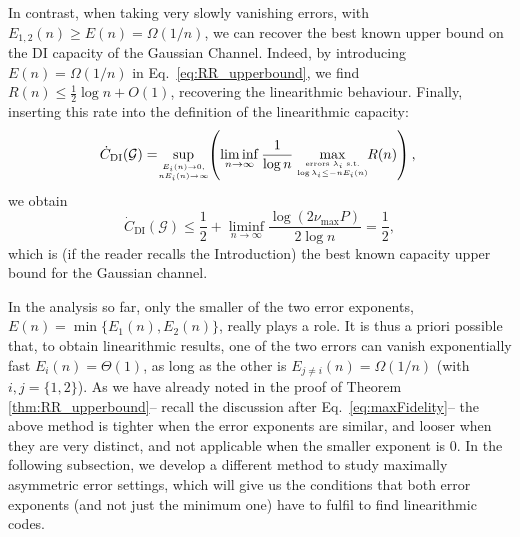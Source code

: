 \documentclass[10pt,conference]{IEEEtran}
\newcommand{\1}{\mathds{1}}
\newcommand{\cG}{\mathcal{G}}
\newcommand\myfrac[2]{\genfrac{}{}{0pt}{}{#1}{#2}}
\newcommand{\aw}[1]{{\color{blue}#1}}
\begin{document}
In contrast, when taking very slowly vanishing errors, with $E_{1,2}(n) \geq E(n) = \Omega(1/n)$, we can recover the best known upper bound on the DI capacity of the Gaussian Channel. Indeed, by introducing $E(n)=\Omega(1/n)$ in Eq.~\eqref{eq:RR_upperbound}, we find $R(n)\leq \frac12 \log n + O(1)$, recovering the linearithmic behaviour. Finally, inserting this rate into the definition of the linearithmic capacity:
\begin{equation}\label{eq:capacity}
\!\!\dot{C}_\text{DI}(\cG) 
    =\!\! \sup_{\myfrac{E_i(n)\rightarrow 0,}{nE_i(n)\rightarrow\infty}} \!\!
      \left( \liminf_{n\rightarrow\infty} \frac{1}{\log n} \max_{\myfrac{\text{errors }\lambda_i\text{ s.t.}}{\log \lambda_i \leq -nE_i(n)}}\!\! R(n) \right),
\end{equation}
we obtain
\begin{equation}
\dot{C}_\text{DI}(\cG)\leq\frac12+\liminf_{n\to\infty}\frac{\log(2\nu_{\max}P)}{2\log n}=\frac12,
\end{equation}
which is (if the reader recalls the Introduction) the best known capacity upper bound for the Gaussian channel.


In the analysis so far, only the smaller of the two error exponents, $E(n)=\min\{E_1(n),E_2(n)\}$, really plays a role. 
It is thus a priori possible that, to obtain linearithmic results, one of the two errors can vanish exponentially fast $E_i(n)=\Theta(1)$, as long as the other is $E_{j\ne i}(n)=\Omega(1/n)$ (with $i,j=\{1,2\}$). As we have already noted in the proof of Theorem \ref{thm:RR_upperbound}-- recall the discussion after Eq.~\eqref{eq:maxFidelity}-- the above method is tighter when the error exponents are similar, and looser when they are very distinct, and not applicable when the smaller exponent is $0$.
In the following subsection, we develop a different method to study maximally asymmetric error settings, which will give us the conditions that both error exponents (and not just the minimum one) have to fulfil to find linearithmic codes.


\medskip
\end{document}
